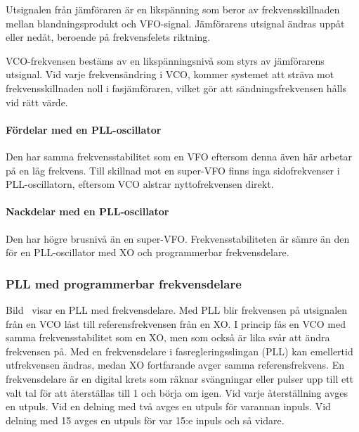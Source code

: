 Utsignalen från jämföraren är en likspänning som beror av frekvensskillnaden
mellan blandningsprodukt och VFO-signal.
Jämförarens utsignal ändras uppåt eller nedåt, beroende på frekvensfelets
riktning.

VCO-frekvensen bestäms av en likspänningsnivå som styrs av jämförarens
utsignal.
Vid varje frekvensändring i VCO, kommer systemet att sträva mot
frekvensskillnaden noll i fasjämföraren, vilket gör att sändningsfrekvensen
hålls vid rätt värde.

\paragraph{Fördelar med en PLL-oscillator}
Den har samma frekvensstabilitet som en VFO eftersom denna även här arbetar på
en låg frekvens.
Till skillnad mot en super-VFO finns inga sidofrekvenser i PLL-oscillatorn,
eftersom VCO alstrar nyttofrekvensen direkt.

\paragraph{Nackdelar med en PLL-oscillator}
Den har högre brusnivå än en super-VFO.
Frekvensstabiliteten är sämre än den för en PLL-oscillator med XO och
programmerbar frekvensdelare.

\subsubsection{PLL med programmerbar frekvensdelare}


Bild~ visar en PLL med frekvensdelare.
Med PLL blir frekvensen på utsignalen från en VCO låst till referensfrekvensen
från en XO.
I princip fås en VCO med samma frekvensstabilitet som en XO, men som också är
lika svår att ändra frekvensen på.
Med en frekvensdelare i fasregleringsslingan (PLL) kan emellertid utfrekvensen
ändras, medan XO fortfarande avger samma referensfrekvens.
En frekvensdelare är en digital krets som räknar svängningar eller pulser upp
till ett valt tal för att återställas till 1 och börja om igen.
Vid varje återställning avges en utpuls.
Vid en delning med två avges en utpuls för varannan inpuls.
Vid delning med 15 avges en utpuls för var 15:e inpuls och så vidare.

